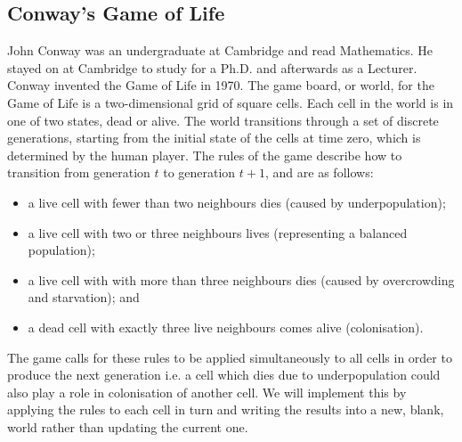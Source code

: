 \documentclass[10pt,a4paper,fleqn]{exam}
\begin{document}
\begin{questions}

\section{Conway's Game of Life}

\question John Conway was an undergraduate at Cambridge and read Mathematics. He stayed on at Cambridge to study for a Ph.D. and afterwards as a Lecturer. Conway invented the Game of Life in 1970. The game board, or world, for the Game of Life is a two-dimensional grid of square cells. Each cell in the world is in one of two states, dead or alive. The world transitions through a set of discrete generations, starting from the initial state of the cells at time zero, which is determined by the human player. The rules of the game describe how to transition from generation $t$ to generation $t+1$, and are as follows:
\begin{itemize}
\item a live cell with fewer than two neighbours dies (caused by underpopulation);
\item a live cell with two or three neighbours lives (representing a balanced population);
\item a live cell with with more than three neighbours dies (caused by overcrowding and starvation); and
\item a dead cell with exactly three live neighbours comes alive (colonisation).
\end{itemize}
The game calls for these rules to be applied simultaneously to all cells in order to produce the next generation i.e. a cell which dies due to underpopulation could also play a role in colonisation of another cell. We will implement this by applying the rules to each cell in turn and writing the results into a new, blank, world rather than updating the current one.

\end{questions}
\end{document}
